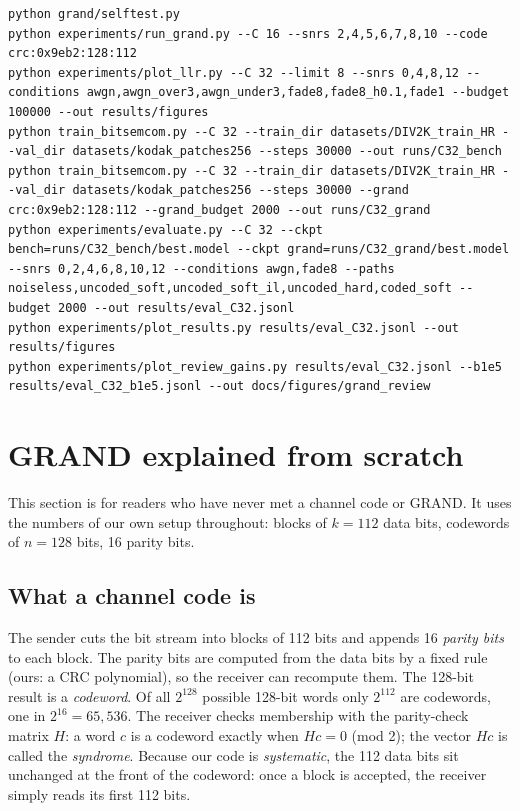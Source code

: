 \documentclass{article}
\begin{document}
\begin{lstlisting}
python grand/selftest.py
python experiments/run_grand.py --C 16 --snrs 2,4,5,6,7,8,10 --code crc:0x9eb2:128:112
python experiments/plot_llr.py --C 32 --limit 8 --snrs 0,4,8,12 --conditions awgn,awgn_over3,awgn_under3,fade8,fade8_h0.1,fade1 --budget 100000 --out results/figures
python train_bitsemcom.py --C 32 --train_dir datasets/DIV2K_train_HR --val_dir datasets/kodak_patches256 --steps 30000 --out runs/C32_bench
python train_bitsemcom.py --C 32 --train_dir datasets/DIV2K_train_HR --val_dir datasets/kodak_patches256 --steps 30000 --grand crc:0x9eb2:128:112 --grand_budget 2000 --out runs/C32_grand
python experiments/evaluate.py --C 32 --ckpt bench=runs/C32_bench/best.model --ckpt grand=runs/C32_grand/best.model --snrs 0,2,4,6,8,10,12 --conditions awgn,fade8 --paths noiseless,uncoded_soft,uncoded_soft_il,uncoded_hard,coded_soft --budget 2000 --out results/eval_C32.jsonl
python experiments/plot_results.py results/eval_C32.jsonl --out results/figures
python experiments/plot_review_gains.py results/eval_C32.jsonl --b1e5 results/eval_C32_b1e5.jsonl --out docs/figures/grand_review
\end{lstlisting}

\section{GRAND explained from scratch}
\label{sec:grand}

This section is for readers who have never met a channel code or GRAND. It uses the numbers of our own
setup throughout: blocks of $k=112$ data bits, codewords of $n=128$ bits, 16 parity bits.

\subsection{What a channel code is}

The sender cuts the bit stream into blocks of 112 bits and appends 16 \emph{parity bits} to each block.
The parity bits are computed from the data bits by a fixed rule (ours: a CRC polynomial), so the
receiver can recompute them. The 128-bit result is a \emph{codeword}. Of all $2^{128}$ possible 128-bit
words only $2^{112}$ are codewords, one in $2^{16}=65{,}536$. The receiver checks membership with the
parity-check matrix $H$: a word $c$ is a codeword exactly when $Hc=0$ (mod 2); the vector $Hc$ is called
the \emph{syndrome}. Because our code is \emph{systematic}, the 112 data bits sit unchanged at the front
of the codeword: once a block is accepted, the receiver simply reads its first 112 bits.
\end{document}
